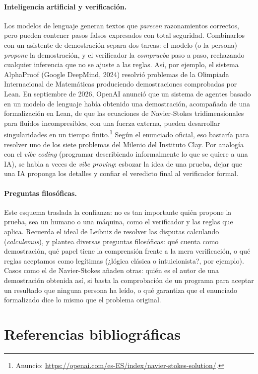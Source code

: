 \paragraph{Inteligencia artificial y verificación.} Los modelos de
lenguaje generan textos que \emph{parecen} razonamientos correctos,
pero pueden contener pasos falsos expresados con total
seguridad. Combinarlos con un asistente de demostración separa dos
tareas: el modelo (o la persona) \emph{propone} la demostración, y el
verificador la \emph{comprueba} paso a paso, rechazando cualquier
inferencia que no se ajuste a las reglas. Así, por ejemplo, el sistema
AlphaProof (Google DeepMind, 2024) resolvió problemas de la Olimpiada
Internacional de Matemáticas produciendo demostraciones comprobadas
por Lean. En septiembre de 2026, OpenAI anunció que un sistema de
agentes basado en un modelo de lenguaje había obtenido una
demostración, acompañada de una formalización en Lean, de que las
ecuaciones de Navier-Stokes tridimensionales para fluidos
incompresibles, con una fuerza externa, pueden desarrollar
singularidades en un tiempo finito.\footnote{Anuncio:
  \url{https://openai.com/es-ES/index/navier-stokes-solution/}.} Según
el enunciado oficial, eso bastaría para resolver uno de los siete
problemas del Milenio del Instituto Clay. Por analogía con el
\emph{vibe coding} (programar describiendo informalmente lo que se
quiere a una IA), se habla a veces de \emph{vibe proving}: esbozar la
idea de una prueba, dejar que una IA proponga los detalles y confiar
el veredicto final al verificador formal. 

\paragraph{Preguntas filosóficas.} Este esquema traslada la confianza: no es tan importante quién propone la prueba, sea un humano o una máquina, como el verificador y las reglas que aplica. Recuerda el ideal de Leibniz de resolver las disputas calculando (\emph{calculemus}), y plantea diversas preguntas filosóficas: qué cuenta como demostración, qué papel tiene la comprensión frente a la mera verificación, o qué reglas aceptamos como legítimas (¿lógica clásica o intuicionista?, por ejemplo). Casos como el de Navier-Stokes añaden otras: quién es el autor de una demostración obtenida así, si basta la comprobación de un programa para aceptar un resultado que ninguna persona ha leído, o qué garantiza que el enunciado formalizado dice lo mismo que el problema original. 

\section*{Referencias bibliográficas}

